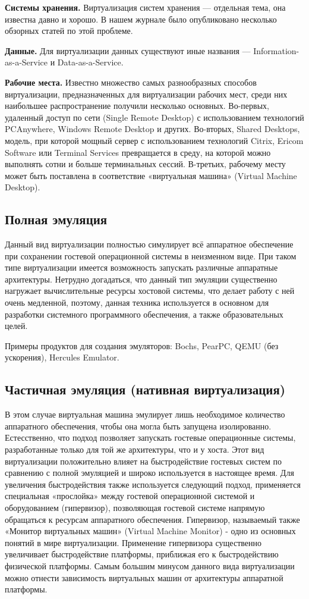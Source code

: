 \textbf{Системы хранения.}
Виртуализация систем хранения — отдельная тема, она известна давно и хорошо. В нашем журнале было опубликовано несколько обзорных статей по этой проблеме.

\textbf{Данные.}
Для виртуализации данных существуют иные названия — Information-as-a-Service и Data-as-a-Service.

\textbf{Рабочие места.}
Известно множество самых разнообразных способов виртуализации, предназначенных для виртуализации рабочих мест, среди них наибольшее распространение получили несколько основных. Во-первых, удаленный доступ по сети (Single Remote Desktop) с использованием технологий PCAnywhere, Windows Remote Desktop и других. Во-вторых, Shared Desktops, модель, при которой мощный сервер с использованием технологий Citrix, Ericom Software или Terminal Services превращается в среду, на которой можно выполнять сотни и больше терминальных сессий. В-третьих, рабочему месту может быть поставлена в соответствие «виртуальная машина» (Virtual Machine Desktop). 

\subsection{Полная эмуляция}\label{sec:full_amu}
Данный вид виртуализации полностью симулирует всё аппаратное обеспечение при сохранении гостевой операционной системы в неизменном виде. При таком типе виртуализации имеется возможность запускать различные аппаратные архитектуры. Нетрудно догадаться, что данный тип эмуляции существенно нагружает вычислительные ресурсы хостовой системы, что делает работу с ней очень медленной, поэтому, данная техника используется в основном для разработки системного программного обеспечения, а также образовательных целей.

Примеры продуктов для создания эмуляторов: Bochs, PearPC, QEMU (без ускорения), Hercules Emulator.

\subsection{Частичная эмуляция (нативная виртуализация)}\label{sec:part_emu}
В этом случае виртуальная машина эмулирует лишь необходимое количество аппаратного обеспечения, чтобы она могла быть запущена изолированно. Естесственно, что подход позволяет запускать гостевые операционные системы, разработанные только для той же архитектуры, что и у хоста. Этот вид виртуализации положительно влияет на быстродействие гостевых систем по сравнению с полной эмуляцией и широко используется в настоящее время. Для увеличения быстродействия также используется следующий подход, применяется специальная «прослойка» между гостевой операционной системой и оборудованием (гипервизор), позволяющая гостевой системе напрямую обращаться к ресурсам аппаратного обеспечения. Гипервизор, называемый также «Монитор виртуальных машин» (Virtual Machine Monitor) - одно из основных понятий в мире виртуализации. Применение гипервизора существенно увеличивает быстродействие платформы, приближая его к быстродействию физической платформы. Самым большим минусом данного вида виртуализации можно отнести зависимость виртуальных машин от архитектуры аппаратной платформы.

